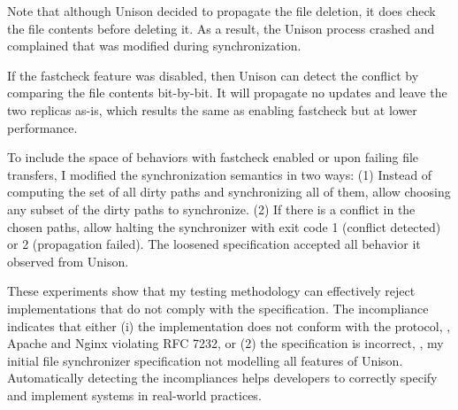 Note that although Unison decided to propagate the file deletion, it does
check the file contents before deleting it.  As a result, the Unison process
crashed and complained that  was modified during synchronization.

If the fastcheck feature was disabled, then Unison can detect the conflict by
comparing the file contents bit-by-bit.  It will propagate no updates and leave
the two replicas as-is, which results the same as enabling fastcheck but at
lower performance.

To include the space of behaviors with fastcheck enabled or upon failing file
transfers, I modified the synchronization semantics in two ways: (1) Instead of
computing the set of all dirty paths and synchronizing all of them, allow
choosing any subset of the dirty paths to synchronize.  (2) If there is a
conflict in the chosen paths, allow halting the synchronizer with exit code 1
(conflict detected) or 2 (propagation failed).  The loosened specification
accepted all behavior it observed from Unison.

These experiments show that my testing methodology can effectively reject
implementations that do not comply with the specification.  The incompliance
indicates that either (i) the implementation does not conform with the protocol,
\eg, Apache and Nginx violating RFC 7232, or (2) the specification is
incorrect, \eg, my initial file synchronizer specification not modelling all
features of Unison.  Automatically detecting the incompliances helps developers
to correctly specify and implement systems in real-world practices.
